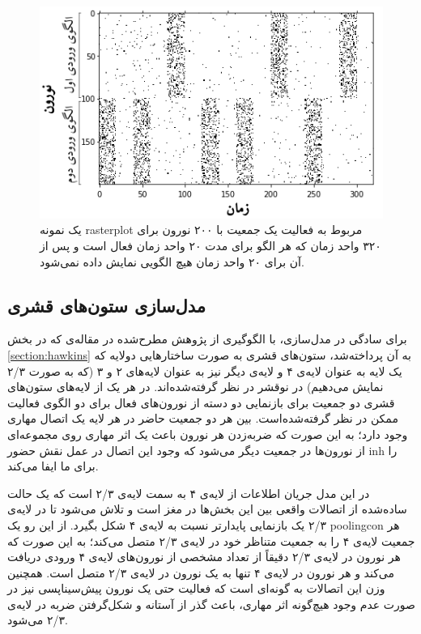 \documentclass[12pt]{report}
\begin{document}
\begin{figure}[]
	\centering
	\includegraphics[width=1.0\linewidth]{input-range.png}
	\caption[NS]{
		یک نمونه \gls{rasterplot} مربوط به فعالیت یک جمعیت با ۲۰۰ نورون برای ۳۲۰ واحد زمان که هر الگو برای مدت ۲۰ واحد زمان فعال است و پس از آن برای ۲۰ واحد زمان هیچ الگویی نمایش داده نمی‌شود.
	}
	\label{fig:input-range} 
\end{figure}
	
	\subsection{مدل‌سازی ستون‌های قشری}
	
	برای سادگی در مدل‌سازی، با الگوگیری از پژوهش مطرح‌شده در مقاله‌ی \cite{Hawkins2017}  که در بخش \ref{section:hawkins} به آن پرداخته‌شد، ستون‌های قشری به صورت ساختارهایی دو‌لایه که یک لایه به عنوان لایه‌ی ۴ و لایه‌ی دیگر نیز به عنوان لایه‌‌های ۲ و ۳ (که به صورت ۲/۳ نمایش می‌دهیم) در نوقشر در نظر گرفته‌شده‌اند. در هر یک از لایه‌های ستون‌های قشری دو جمعیت برای بازنمایی دو دسته‌ از نورون‌های فعال برای دو الگوی فعالیت ممکن در نظر گرفته‌شده‌است. بین هر دو جمعیت حاضر در هر لایه یک اتصال مهاری وجود دارد؛ به این صورت که ضربه‌زدن هر نورون باعث یک اثر مهاری روی مجموعه‌ای از نورون‌ها در جمعیت دیگر می‌شود که وجود این اتصال در عمل نقش حضور \gls{inh} را برای ما ایفا می‌کند.
	
	در این مدل جریان اطلاعات از لایه‌ی ۴ به سمت لایه‌ی‌ ۲/۳ است که یک حالت ساده‌شده از اتصالات واقعی بین این بخش‌ها در مغز است و تلاش می‌شود تا در لایه‌ی ۲/۳ یک بازنمایی پایدار‌تر نسبت به لایه‌ی ۴ شکل بگیرد. از این رو یک \gls{poolingcon} هر جمعیت لایه‌ی ۴ را به جمعیت متناظر خود در لایه‌ی ۲/۳ متصل می‌کند؛ به این صورت که هر نورون در لایه‌ی ۲/۳ دقیقاً از تعداد مشخصی از نورون‌های لایه‌ی ۴ ورودی دریافت می‌کند و هر نورون در لایه‌ی ۴ تنها به یک نورون در لایه‌ی ۲/۳ متصل است. همچنین وزن این اتصالات به گونه‌ای است که فعالیت حتی یک نورون پیش‌سیناپسی نیز در صورت عدم وجود هیچ‌گونه اثر مهاری، باعث گذر از آستانه و شکل‌گرفتن ضربه در لایه‌ی ۲/۳ می‌شود. 
	
\end{document}
